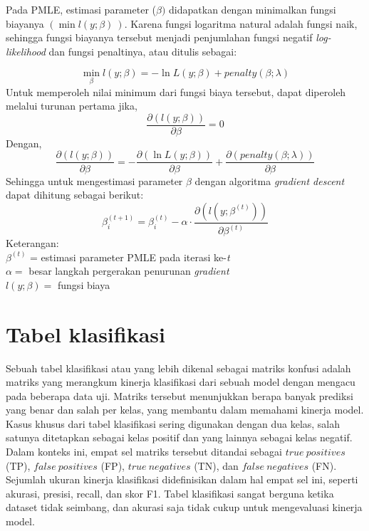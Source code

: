 Pada PMLE, estimasi parameter (\(\beta)\) didapatkan dengan minimalkan
fungsi biayanya \(\left( \min{l(y;\beta)}\  \right)\). Karena fungsi
logaritma natural adalah fungsi naik, sehingga fungsi biayanya tersebut
menjadi penjumlahan fungsi negatif \emph{log-likelihood} dan fungsi
penaltinya, atau ditulis sebagai:

\begin{equation}\label{objektifPenalty}
    \min_{\beta}{l(y;\beta)} = - \ln{L(y;\beta)} + penalty(\beta;\lambda)
\end{equation}
Untuk memperoleh nilai minimum dari fungsi biaya tersebut, dapat
diperoleh melalui turunan pertama jika,
\begin{equation}
    \frac{\partial\left( l(y;\beta) \right)}{\partial\beta} = 0
\end{equation}
Dengan,
\begin{equation}\label{turunanParsial2}
    \frac{\partial\left( l(y;\beta) \right)}{\partial\beta} = - \frac{\partial\left( \ln{L(y;\beta)} \right)}{\partial\beta} + \frac{\partial\left( penalty(\beta;\lambda) \right)}{\partial\beta}
\end{equation}
Sehingga untuk mengestimasi parameter \(\beta\) dengan algoritma
\emph{gradient descent} dapat dihitung sebagai berikut:
\begin{equation}
    \beta_{i}^{(t + 1)} = \beta_{i}^{(t)} - \alpha \cdot \frac{\partial\left( l\left( y;\beta^{(t)} \right) \right)}{\partial\beta^{(t)}}
\end{equation}
Keterangan:\\
\(\beta^{(t)}\) = estimasi parameter PMLE pada iterasi ke-\emph{t} \\
\(\alpha =\) besar langkah pergerakan penurunan \emph{gradient} \\
\(l(y;\beta) =\) fungsi biaya \\
%
\section{Tabel klasifikasi}
Sebuah tabel klasifikasi atau yang lebih dikenal sebagai matriks konfusi
adalah matriks yang merangkum kinerja klasifikasi dari sebuah model
dengan mengacu pada beberapa data uji. Matriks tersebut menunjukkan
berapa banyak prediksi yang benar dan salah per kelas, yang membantu
dalam memahami kinerja model. Kasus khusus dari tabel klasifikasi sering
digunakan dengan dua kelas, salah satunya ditetapkan sebagai kelas
positif dan yang lainnya sebagai kelas negatif. Dalam konteks ini, empat
sel matriks tersebut ditandai sebagai \(true\ positives\) (TP),
\(false\ positives\) (FP), \(true\ negatives\) (TN), dan
\(false\ negatives\) (FN). Sejumlah ukuran kinerja klasifikasi
didefinisikan dalam hal empat sel ini, seperti akurasi, presisi, recall,
dan skor F1. Tabel klasifikasi sangat berguna ketika dataset tidak
seimbang, dan akurasi saja tidak cukup untuk mengevaluasi kinerja model.

